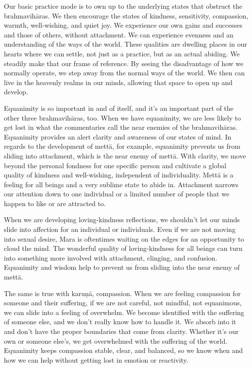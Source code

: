 Our basic practice mode is to own up to the underlying states that obstruct the brahmavihāras. We then encourage the states of kindness, sensitivity, compassion, warmth, well-wishing, and quiet joy. We experience our own gains and successes and those of others, without attachment. We can experience evenness and an understanding of the ways of the world. These qualities are dwelling places in our hearts where we can settle, not just as a practice, but as an actual abiding. We steadily make that our frame of reference. By seeing the disadvantage of how we normally operate, we step away from the normal ways of the world. We then can live in the heavenly realms in our minds, allowing that space to open up and develop.

Equanimity is so important in and of itself, and it's an important part of the other three brahmavihāras, too. When we have equanimity, we are less likely to get lost in what the commentaries call the near enemies of the brahmavihāras. Equanimity provides an alert clarity and awareness of our states of mind. In regards to the development of mettā, for example, equanimity prevents us from sliding into attachment, which is the near enemy of mettā. With clarity, we move beyond the personal fondness for one specific person and cultivate a global quality of kindness and well-wishing, independent of individuality. Mettā is a feeling for all beings and a very sublime state to abide in. Attachment narrows our attention down to one individual or a limited number of people that we happen to like or are attracted to.

When we are developing loving-kindness reflections, we shouldn't let our minds slide into affection for an individual or individuals. Even if we are not moving into sexual desire, Mara is oftentimes waiting on the edges for an opportunity to cloud the mind. The wonderful quality of loving-kindness for all beings can turn into something more involved with attachment, clinging, and confusion. Equanimity and wisdom help to prevent us from sliding into the near enemy of mettā.

The same is true with karuṇā, compassion. When we are feeling compassion for someone and their suffering, if we are not careful, not mindful, not equanimous, we can slide into a feeling of overwhelm. We become identified with the suffering of someone else, and we don't really know how to handle it. We absorb into it and don't have the proper boundaries that come from clarity. Whether it's our own or someone else's, we get overwhelmed with the suffering of the world. Equanimity keeps compassion stable, clear, and balanced, so we know when and how we can help without getting lost in emotion or reactivity.

